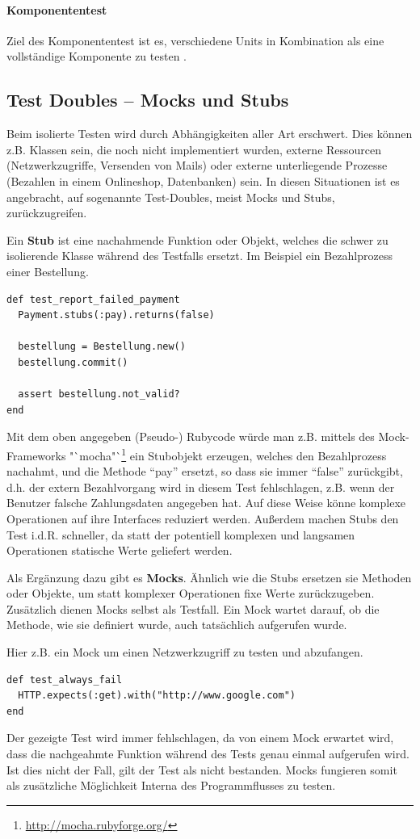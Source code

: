 \paragraph{Komponententest}
Ziel des Komponententest ist es, verschiedene Units in Kombination als eine vollständige Komponente zu testen \citep{goodliffe_code_2006}.

 \subsection{Test Doubles -- Mocks und Stubs}
  \label{sec:mocks}
  Beim isolierte Testen wird durch Abhängigkeiten aller Art erschwert. Dies können z.B. Klassen sein, die noch nicht implementiert wurden, externe Ressourcen (Netzwerkzugriffe, Versenden von Mails) oder externe unterliegende Prozesse (Bezahlen in einem Onlineshop, Datenbanken) sein. In diesen Situationen ist es angebracht, auf sogenannte Test-Doubles, meist Mocks und Stubs, zurückzugreifen.
  
  Ein \textbf{Stub} ist eine nachahmende Funktion oder Objekt, welches die schwer zu isolierende Klasse während des Testfalls ersetzt. Im Beispiel ein Bezahlprozess einer Bestellung.
  \begin{lstlisting}
def test_report_failed_payment
  Payment.stubs(:pay).returns(false)
  
  bestellung = Bestellung.new()
  bestellung.commit()
  
  assert bestellung.not_valid?
end
  \end{lstlisting}
  Mit dem oben angegeben (Pseudo-) Rubycode würde man z.B. mittels des Mock-Frameworks "`mocha"`\footnote{\url{http://mocha.rubyforge.org/}} ein Stubobjekt erzeugen, welches den Bezahlprozess nachahmt, und die Methode "`pay"' ersetzt, so dass sie immer "`false"' zurückgibt, d.h. der extern Bezahlvorgang wird in diesem Test fehlschlagen, z.B. wenn der Benutzer falsche Zahlungsdaten angegeben hat. Auf diese Weise könne komplexe Operationen auf ihre Interfaces reduziert werden. Außerdem machen Stubs den Test i.d.R. schneller, da statt der potentiell komplexen und langsamen Operationen statische Werte geliefert werden.
  
  
  Als Ergänzung dazu gibt es \textbf{Mocks}. Ähnlich wie die Stubs ersetzen sie Methoden oder Objekte, um statt komplexer Operationen fixe Werte zurückzugeben. Zusätzlich dienen Mocks selbst als Testfall. Ein Mock wartet darauf, ob die Methode, wie sie definiert wurde, auch tatsächlich aufgerufen wurde.
  
  Hier z.B. ein Mock um einen Netzwerkzugriff zu testen und abzufangen.
  \begin{lstlisting}
def test_always_fail
  HTTP.expects(:get).with("http://www.google.com")
end
  \end{lstlisting}
  Der gezeigte Test wird immer fehlschlagen, da von einem Mock erwartet wird, dass die nachgeahmte Funktion während des Tests genau einmal aufgerufen wird. Ist dies nicht der Fall, gilt der Test als nicht bestanden. Mocks fungieren somit als zusätzliche Möglichkeit Interna des Programmflusses zu testen. 

